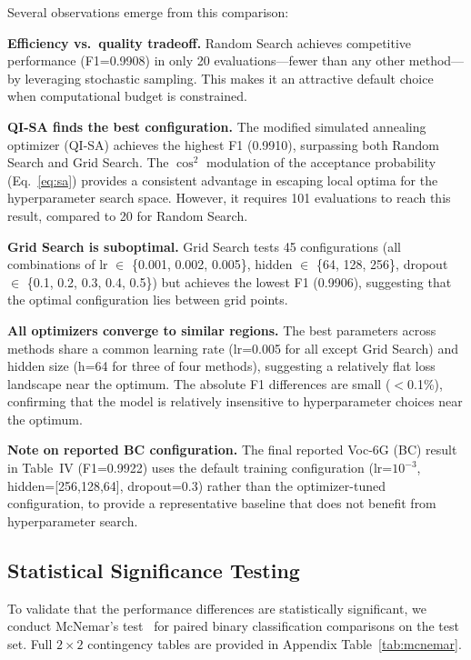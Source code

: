 \documentclass[journal,twoside]{IEEEtran}
\begin{document}
Several observations emerge from this comparison:

\textbf{Efficiency vs.\ quality tradeoff.} Random Search achieves competitive performance (F1=0.9908) in only 20 evaluations---fewer than any other method---by leveraging stochastic sampling. This makes it an attractive default choice when computational budget is constrained.

\textbf{QI-SA finds the best configuration.} The modified simulated annealing optimizer (QI-SA) achieves the highest F1 (0.9910), surpassing both Random Search and Grid Search. The $\cos^2$ modulation of the acceptance probability (Eq.~\ref{eq:sa}) provides a consistent advantage in escaping local optima for the hyperparameter search space. However, it requires 101 evaluations to reach this result, compared to 20 for Random Search.

\textbf{Grid Search is suboptimal.} Grid Search tests 45 configurations (all combinations of lr $\in$ \{0.001, 0.002, 0.005\}, hidden $\in$ \{64, 128, 256\}, dropout $\in$ \{0.1, 0.2, 0.3, 0.4, 0.5\}) but achieves the lowest F1 (0.9906), suggesting that the optimal configuration lies between grid points.

\textbf{All optimizers converge to similar regions.} The best parameters across methods share a common learning rate (lr=0.005 for all except Grid Search) and hidden size (h=64 for three of four methods), suggesting a relatively flat loss landscape near the optimum. The absolute F1 differences are small ($<$0.1\%), confirming that the model is relatively insensitive to hyperparameter choices near the optimum.

\textbf{Note on reported BC configuration.} The final reported Voc-6G (BC) result in Table~IV (F1=0.9922) uses the default training configuration (lr=$10^{-3}$, hidden=[256,128,64], dropout=0.3) rather than the optimizer-tuned configuration, to provide a representative baseline that does not benefit from hyperparameter search.

\subsection{Statistical Significance Testing}

To validate that the performance differences are statistically significant, we conduct McNemar's test~\cite{mcnemar1947note} for paired binary classification comparisons on the test set. Full $2 \times 2$ contingency tables are provided in Appendix Table~\ref{tab:mcnemar}.
\end{document}

